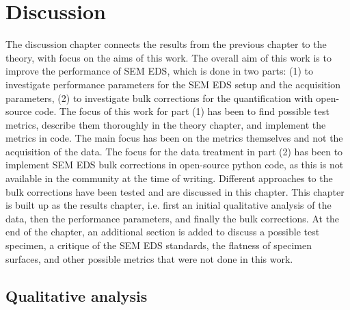 %
\chapter{Discussion}
\label{ch:discussion}

The discussion chapter connects the results from the previous chapter to the theory, with focus on the aims of this work.
The overall aim of this work is to improve the performance of SEM EDS, which is done in two parts:
(1) to investigate performance parameters for the SEM EDS setup and the acquisition parameters, (2) to investigate bulk corrections for the quantification with open-source code.
The focus of this work for part (1) has been to find possible test metrics, describe them thoroughly in the theory chapter, and implement the metrics in code.
The main focus has been on the metrics themselves and not the acquisition of the data.
The focus for the data treatment in part (2) has been to implement SEM EDS bulk corrections in open-source python code, as this is not available in the community at the time of writing.
Different approaches to the bulk corrections have been tested and are discussed in this chapter.
This chapter is built up as the results chapter, i.e. first an initial qualitative analysis of the data, then the performance parameters, and finally the bulk corrections.
At the end of the chapter, an additional section is added to discuss a possible test specimen, a critique of the SEM EDS standards, the flatness of specimen surfaces, and other possible metrics that were not done in this work.












\section{Qualitative analysis}
\label{discussion:qualitative_analysis}


